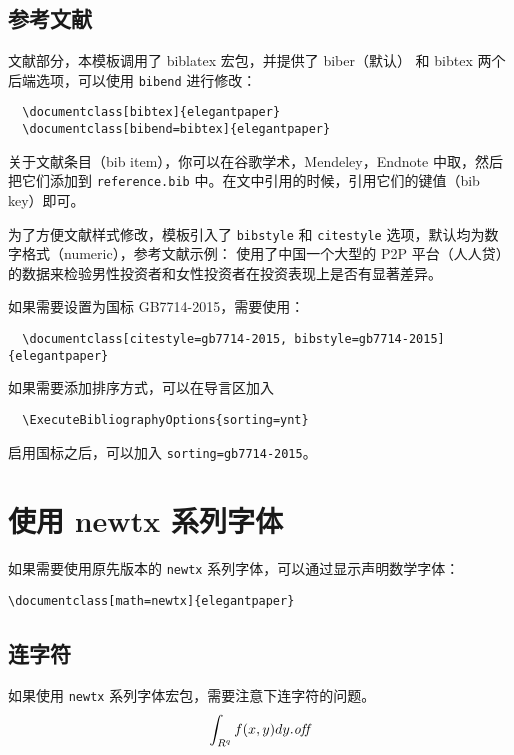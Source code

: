 \documentclass[lang=cn,a4paper,newtx]{elegantpaper}
\begin{document}
\subsection{参考文献}

文献部分，本模板调用了 biblatex 宏包，并提供了 biber（默认） 和 bibtex 两个后端选项，可以使用 \lstinline{bibend} 进行修改：

\begin{lstlisting}
  \documentclass[bibtex]{elegantpaper}
  \documentclass[bibend=bibtex]{elegantpaper}
\end{lstlisting}

关于文献条目（bib item），你可以在谷歌学术，Mendeley，Endnote 中取，然后把它们添加到 \lstinline{reference.bib} 中。在文中引用的时候，引用它们的键值（bib key）即可。

为了方便文献样式修改，模板引入了 \lstinline{bibstyle} 和 \lstinline{citestyle} 选项，默认均为数字格式（numeric），参考文献示例：\cite{cn1,en2,en3} 使用了中国一个大型的 P2P 平台（人人贷）的数据来检验男性投资者和女性投资者在投资表现上是否有显著差异。

如果需要设置为国标 GB7714-2015，需要使用：
\begin{lstlisting}
  \documentclass[citestyle=gb7714-2015, bibstyle=gb7714-2015]{elegantpaper} 
\end{lstlisting}

如果需要添加排序方式，可以在导言区加入
\begin{lstlisting}
  \ExecuteBibliographyOptions{sorting=ynt}
\end{lstlisting}

启用国标之后，可以加入 \lstinline{sorting=gb7714-2015}。


\section{使用 newtx 系列字体}

如果需要使用原先版本的 \lstinline{newtx} 系列字体，可以通过显示声明数学字体：

\begin{lstlisting}
\documentclass[math=newtx]{elegantpaper}
\end{lstlisting}

\subsection{连字符}

如果使用 \lstinline{newtx} 系列字体宏包，需要注意下连字符的问题。
\begin{equation}
  \int_{R^q} f(x,y) dy.\emph{of\kern0pt f}
\end{equation}
\end{document}
